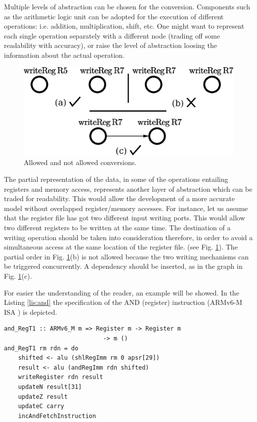 \documentclass[conference]{IEEEtran}
\begin{document}
Multiple levels of abstraction can be chosen for the conversion. Components such as the
arithmetic logic unit can be adopted for the execution of
different operations: i.e. addition, multiplication, shift, etc. One might want to represent
each single operation separately with a different node 
(trading off some readability with accuracy), or raise the
level of abstraction loosing the information about the actual operation.

\begin{figure}[ht!]
\begin{center}
	\includegraphics[width=\linewidth]{IMG/depPO.eps}
	\caption{Allowed and not allowed conversions.}
	\label{fig:depPO}
\end{center}
\end{figure}

The partial representation of the data, in some of the operations entailing registers and
memory access, represents another layer of abstraction which can be traded for readability.
This would allow the development of a more accurate model without overlapped register/memory
accesses. For instance, let us assume that the register file has got two different input
writing ports. This would allow two different registers to be written at the same time.
The destination of a writing operation should be taken into consideration therefore,
in order to avoid a simultaneous access at the same location of the register file.
(see Fig. \ref{fig:depPO}). The partial order in Fig. \ref{fig:depPO}(b) is not allowed
because the two writing mechanisms can be triggered concurrently.
A dependency should be inserted, as in the graph in Fig. \ref{fig:depPO}(c).

For easier the understanding of the reader, an example will be showed. In the Listing
\ref{lis:and} the specification of the AND (register) instruction (ARMv6-M ISA
\cite{armManual}) is depicted.\\

\begin{lstlisting}[caption=AND (register) instruction - Haskell-based specification,
frame=single, label=lis:and]
and_RegT1 :: ARMv6_M m => Register m -> Register m 
			 				-> m ()
and_RegT1 rm rdn = do
    shifted <- alu (shlRegImm rm 0 apsr[29])
    result <- alu (andRegImm rdn shifted)
    writeRegister rdn result
    updateN result[31]
    updateZ result
    updateC carry
    incAndFetchInstruction
\end{lstlisting}
\end{document}
